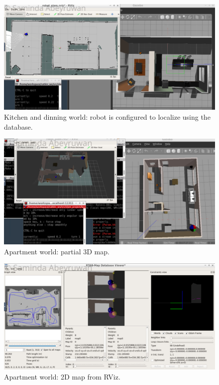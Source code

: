\documentclass[10pt,journal,compsoc]{IEEEtran}
\begin{document}
\begin{figure}[thpb]
      \centering
      \includegraphics[width=\linewidth]{kad_loc_w}
      \caption{Kitchen and dinning world: robot is configured to localize using the database.}
      \label{fig:kad_loc}
\end{figure}

\begin{figure}[thpb]
      \centering
      \includegraphics[width=\linewidth]{apt_3d_w}
      \caption{Apartment world: partial 3D map.}
      \label{fig:apt_3d}
\end{figure}

\begin{figure}[thpb]
      \centering
      \includegraphics[width=\linewidth]{apt_2d_w}
      \caption{Apartment world: 2D map from RViz.}
      \label{fig:apt_2d}
\end{figure}
\end{document}
